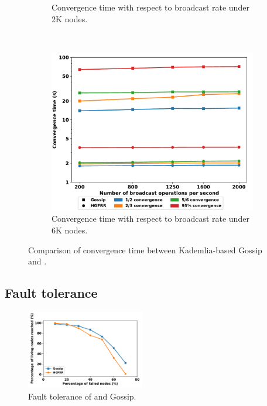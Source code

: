 \begin{figure}[t]
\begin{subfigure}[t]{0.3\textwidth}
    \caption{Convergence time with respect to broadcast rate under 2K nodes.}
    \label{hgfr_ourgossip_cvgtime_on_tps_2k}
    \end{subfigure}
    ~
    \begin{subfigure}[t]{0.3\textwidth}
	  \includegraphics[width=\textwidth]{figures/hgfr_ourgossip_cvgtime_on_tps_6k.pdf}
	  \caption{Convergence time with respect to broadcast rate under 6K nodes.}
    \label{hgfr_ourgossip_cvgtime_on_tps_6k}
    \end{subfigure}

	\caption{Comparison of convergence time between Kademlia-based Gossip and \xxx.}
	\label{fig_eth_ourgossip_cvgtime}
	\vspace{-0.5cm}
\end{figure}

\subsection{Fault tolerance}
\begin{figure}[ht]
	\centering
	  \includegraphics[width=0.46\textwidth]{figures/hgfr_ourgossip_fault.pdf}

	  \caption{Fault tolerance of \xxx and Gossip.}
	  \label{fig_hgfr_gossip_ft}
	  \vspace{-0.5cm}
  \end{figure}

